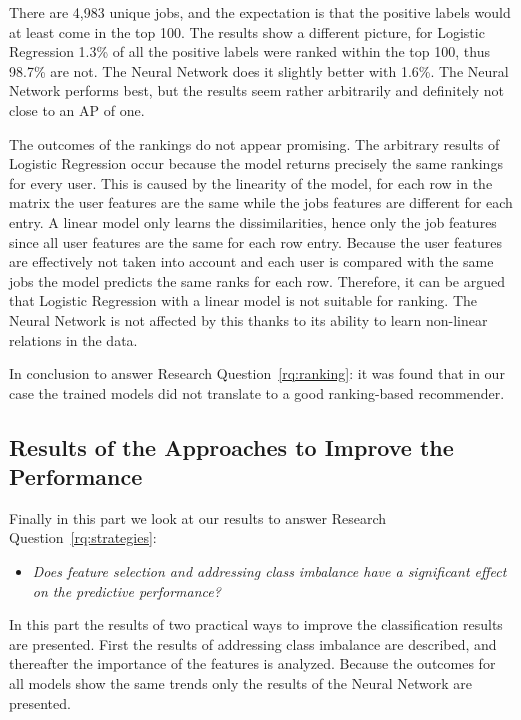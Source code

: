 There are 4,983 unique jobs, and the expectation is that the positive labels would at least come in the top 100. 
The results show a different picture, for Logistic Regression 1.3\% of all the positive labels were ranked within the top 100, thus 98.7\% are not.
The Neural Network does it slightly better with 1.6\%.
The Neural Network performs best, but the results seem rather arbitrarily and definitely not close to an AP of one.

The outcomes of the rankings do not appear promising. 
The arbitrary results of Logistic Regression occur because the model returns precisely the same rankings for every user.
This is caused by the linearity of the model, for each row in the matrix the user features are the same while the jobs features are different for each entry.
A linear model only learns the dissimilarities, hence only the job features since all user features are the same for each row entry. 
Because the user features are effectively not taken into account and each user is compared with the same jobs the model predicts the same ranks for each row.
Therefore, it can be argued that Logistic Regression with a linear model is not suitable for ranking.
The Neural Network is not affected by this thanks to its ability to learn non-linear relations in the data. 

In conclusion to answer Research Question~\ref{rq:ranking}: it was found that in our case the trained models did not translate to a good ranking-based recommender.

\subsection{Results of the Approaches to Improve the Performance}
\label{ssec:ir}

Finally in this part we look at our results to answer Research Question~\ref{rq:strategies}:
\begin{itemize}
	\item[] \em Does feature selection and addressing class imbalance have a significant effect on the predictive performance?
\end{itemize}

\noindent In this part the results of two practical ways to improve the classification results are presented. 
First the results of addressing class imbalance are described, and thereafter the importance of the features is analyzed. 
Because the outcomes for all models show the same trends only the results of the Neural Network are presented.

